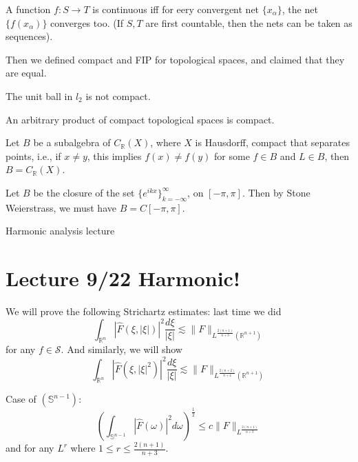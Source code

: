 \documentclass[openany]{book}
\newcommand{\R}{\mathbb{R}}
\begin{document}
\begin{prop}
    A function $f: S\to T$ is continuous iff for eery convergent net $\{x_\alpha\}$, the net $\{f(x_\alpha)\}$ converges too. (If $S,T$ are first countable, then the nets can be taken as sequences).
\end{prop}
Then we defined compact and FIP for topological spaces, and claimed that they are equal.

\begin{example}
    The unit ball in $l_2$ is not compact.
\end{example}

\begin{prop}[Tychnoff]
    An arbitrary product of compact topological spaces is compact.
\end{prop}

\begin{prop}
    Let $B$ be a subalgebra of $C_\R(X)$, where $X$ is Hausdorff, compact that separates points, i.e., if $x\neq y$, this implies $f(x)\neq f(y)$ for some $f\in B$ and $L\in B$, then $B=C_\R(X)$.
\end{prop}




\begin{example}
    Let $B$ be the closure of the set $\{e^{ikx}\}_{k=-\infty}^\infty$, on $[-\pi,\pi]$. Then by Stone Weierstrass, we must have $B=C[-\pi,\pi]$.
\end{example}


Harmonic analysis lecture
\section{Lecture 9/22 Harmonic!}
We will prove the following Strichartz estimates:
last time we did
\begin{equation*}
    \int_{\R^n}|\hat{F}(\xi,|\xi|)|^2\frac{d\xi}{|\xi|}\lesssim\|F\|_{L^\frac{2(n+1)}{n+3}(\R^{n+1})}
\end{equation*}
for any $f\in\mathcal{S}$. And similarly, we will show 
\begin{equation}\label{1}
    \int_{\R^n}|\hat{F}(\xi,|\xi|^2)|^2\frac{d\xi}{|\xi|}\lesssim\|F\|_{L^\frac{2(n+2)}{n+4}(\R^{n+1})}
\end{equation}


\begin{prop}
    Case of $(\mathbb{S}^{n-1})$: 
    \begin{equation*}
        \left(\int_{\mathbb{S}^{n-1}}|\hat{F}(\omega)|^2d\omega\right)^\frac{1}{2}\leq c\|F\|_{L^\frac{2(n+1)}{n+3}}
    \end{equation*}
    and for any $L^r$ where $1\leq r\leq\frac{2(n+1)}{n+3}$.
\end{prop}
\end{document}
